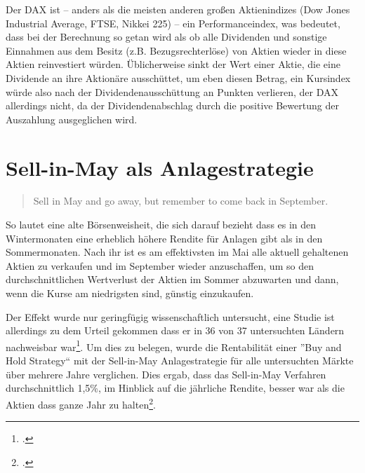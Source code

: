 \documentclass[12pt, a4paper, titlepage]{report}
\begin{document}
            Der DAX ist -- anders als die meisten anderen großen Aktienindizes
            (Dow Jones Industrial Average, FTSE, Nikkei 225) -- ein Performanceindex,
            was bedeutet, dass bei der Berechnung so getan wird als ob alle Dividenden
            und sonstige Einnahmen aus dem Besitz (z.B. Bezugsrechterlöse) von Aktien
            wieder in diese Aktien reinvestiert würden. Üblicherweise sinkt der Wert
            einer Aktie, die eine Dividende an ihre Aktionäre ausschüttet, um eben
            diesen Betrag, ein Kursindex würde also nach der Dividendenausschüttung an
            Punkten verlieren, der DAX allerdings nicht, da der Dividendenabschlag
            durch die positive Bewertung der Auszahlung ausgeglichen wird.
            

        \section{Sell-in-May als Anlagestrategie}
            \begin{quote}
                Sell in May and go away, but remember to come back in September.
            \end{quote}
            So lautet eine alte Börsenweisheit, die sich darauf bezieht dass es
            in den Wintermonaten eine erheblich höhere Rendite für Anlagen gibt
            als in den Sommermonaten. Nach ihr ist es am effektivsten im Mai alle
            aktuell gehaltenen Aktien zu verkaufen und im September wieder anzuschaffen,
            um so den durchschnittlichen Wertverlust der Aktien im Sommer abzuwarten
            und dann, wenn die Kurse am niedrigsten sind, günstig einzukaufen.

            Der Effekt wurde nur geringfügig wissenschaftlich untersucht, eine
            Studie ist allerdings zu dem Urteil gekommen dass er in 36 von 37
            untersuchten Ländern nachweisbar war\footcite[Vgl.][]{bouman2002halloween}.
            Um dies zu belegen, wurde die Rentabilität einer ''Buy and Hold Strategy``
            mit der Sell-in-May Anlagestrategie für alle untersuchten Märkte über
            mehrere Jahre verglichen. Dies ergab, dass das Sell-in-May Verfahren 
            durchschnittlich 1,5\%, im Hinblick auf die jährliche Rendite, besser
            war als die Aktien dass ganze Jahr zu halten\footcite[Vgl.][S. 14 Tabelle A1]{bouman2002halloween}.
\end{document}
